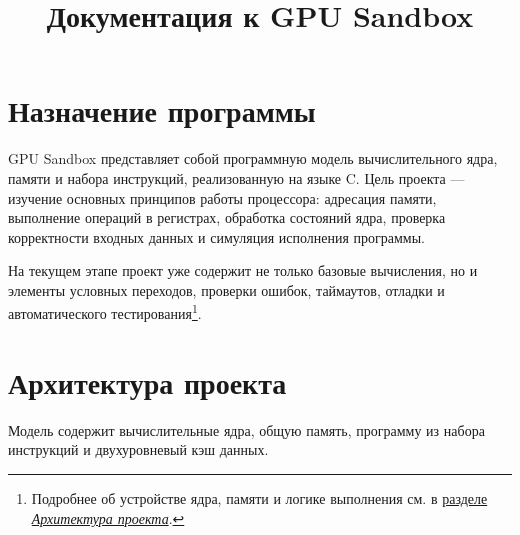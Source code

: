\documentclass[12pt,a4paper]{article}
\title{Документация к GPU Sandbox}
\author{}
\date{}
\begin{document}
\maketitle
\tableofcontents
\newpage

\section{Назначение программы}\label{sec:purpose}

GPU Sandbox представляет собой программную модель вычислительного ядра, памяти и набора инструкций, реализованную на языке C. Цель проекта --- изучение основных принципов работы процессора: адресация памяти, выполнение операций в регистрах, обработка состояний ядра, проверка корректности входных данных и симуляция исполнения программы.

На текущем этапе проект уже содержит не только базовые вычисления, но и элементы условных переходов, проверки ошибок, таймаутов, отладки и автоматического тестирования\footnote{Подробнее об устройстве ядра, памяти и логике выполнения см. в \hyperref[sec:architecture]{разделе \textit{Архитектура проекта}}.}.

\section{Архитектура проекта}\label{sec:architecture}

Модель содержит вычислительные ядра, общую память, программу из набора инструкций и двухуровневый кэш данных.
\end{document}
